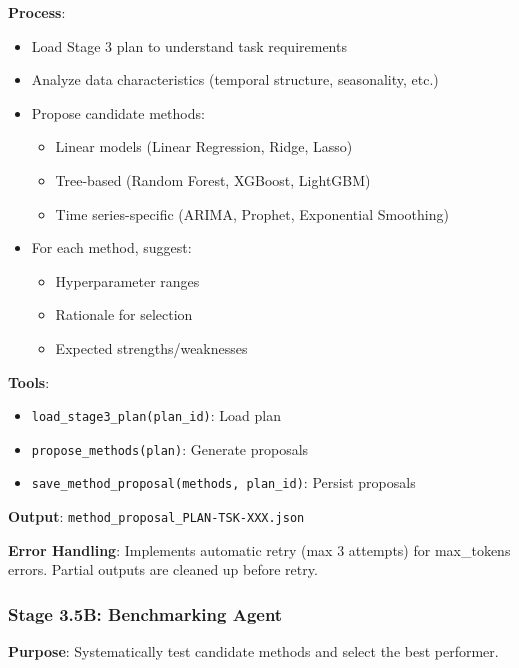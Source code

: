 \documentclass[11pt,a4paper]{article}
\begin{document}
\textbf{Process}:
\begin{itemize}
    \item Load Stage 3 plan to understand task requirements
    \item Analyze data characteristics (temporal structure, seasonality, etc.)
    \item Propose candidate methods:
    \begin{itemize}
        \item Linear models (Linear Regression, Ridge, Lasso)
        \item Tree-based (Random Forest, XGBoost, LightGBM)
        \item Time series-specific (ARIMA, Prophet, Exponential Smoothing)
    \end{itemize}
    \item For each method, suggest:
    \begin{itemize}
        \item Hyperparameter ranges
        \item Rationale for selection
        \item Expected strengths/weaknesses
    \end{itemize}
\end{itemize}

\textbf{Tools}:
\begin{itemize}
    \item \texttt{load\_stage3\_plan(plan\_id)}: Load plan
    \item \texttt{propose\_methods(plan)}: Generate proposals
    \item \texttt{save\_method\_proposal(methods, plan\_id)}: Persist proposals
\end{itemize}

\textbf{Output}: \texttt{method\_proposal\_PLAN-TSK-XXX.json}

\textbf{Error Handling}: Implements automatic retry (max 3 attempts) for max\_tokens errors. Partial outputs are cleaned up before retry.

\subsubsection{Stage 3.5B: Benchmarking Agent}

\textbf{Purpose}: Systematically test candidate methods and select the best performer.
\end{document}
